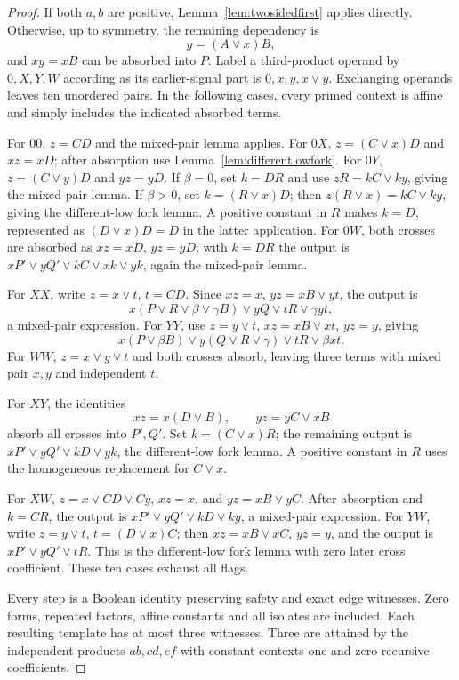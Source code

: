 \documentclass[11pt]{article}
\theoremstyle{definition}
\theoremstyle{remark}
\begin{document}
\begin{proof}
If both $a,b$ are positive, Lemma~\ref{lem:twosidedfirst} applies directly. Otherwise, up to symmetry, the remaining dependency is
\[
 y=(A\vee x)B,
\]
and $xy=xB$ can be absorbed into $P$. Label a third-product operand by $0,X,Y,W$ according as its earlier-signal part is $0,x,y,x\vee y$. Exchanging operands leaves ten unordered pairs. In the following cases, every primed context is affine and simply includes the indicated absorbed terms.

For $00$, $z=CD$ and the mixed-pair lemma applies. For $0X$, $z=(C\vee x)D$ and $xz=xD$; after absorption use Lemma~\ref{lem:differentlowfork}. For $0Y$, $z=(C\vee y)D$ and $yz=yD$. If $\beta=0$, set $k=DR$ and use $zR=kC\vee ky$, giving the mixed-pair lemma. If $\beta>0$, set $k=(R\vee x)D$; then $z(R\vee x)=kC\vee ky$, giving the different-low fork lemma. A positive constant in $R$ makes $k=D$, represented as $(D\vee x)D=D$ in the latter application. For $0W$, both crosses are absorbed as $xz=xD$, $yz=yD$; with $k=DR$ the output is $xP'\vee yQ'\vee kC\vee xk\vee yk$, again the mixed-pair lemma.

For $XX$, write $z=x\vee t$, $t=CD$. Since $xz=x$, $yz=xB\vee yt$, the output is
\[
 x(P\vee R\vee\beta\vee\gamma B)\vee yQ\vee tR\vee\gamma yt,
\]
a mixed-pair expression. For $YY$, use $z=y\vee t$, $xz=xB\vee xt$, $yz=y$, giving
\[
 x(P\vee\beta B)\vee y(Q\vee R\vee\gamma)\vee tR\vee\beta xt.
\]
For $WW$, $z=x\vee y\vee t$ and both crosses absorb, leaving three terms with mixed pair $x,y$ and independent $t$.

For $XY$, the identities
\[
 xz=x(D\vee B),\qquad yz=yC\vee xB
\]
absorb all crosses into $P',Q'$. Set $k=(C\vee x)R$; the remaining output is $xP'\vee yQ'\vee kD\vee yk$, the different-low fork lemma. A positive constant in $R$ uses the homogeneous replacement for $C\vee x$.

For $XW$, $z=x\vee CD\vee Cy$, $xz=x$, and $yz=xB\vee yC$. After absorption and $k=CR$, the output is $xP'\vee yQ'\vee kD\vee ky$, a mixed-pair expression. For $YW$, write $z=y\vee t$, $t=(D\vee x)C$; then $xz=xB\vee xC$, $yz=y$, and the output is $xP'\vee yQ'\vee tR$. This is the different-low fork lemma with zero later cross coefficient. These ten cases exhaust all flags.

Every step is a Boolean identity preserving safety and exact edge witnesses. Zero forms, repeated factors, affine constants and all isolates are included. Each resulting template has at most three witnesses. Three are attained by the independent products $ab,cd,ef$ with constant contexts one and zero recursive coefficients.
\end{proof}
\end{document}
